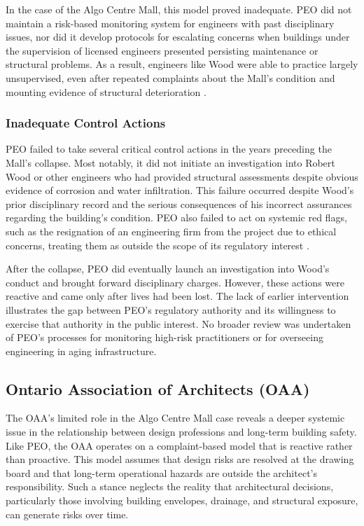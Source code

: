 \documentclass[12pt]{article}
\begin{document}
In the case of the Algo Centre Mall, this model proved inadequate. PEO did not maintain a risk-based monitoring system for engineers with past disciplinary issues, nor did it develop protocols for escalating concerns when buildings under the supervision of licensed engineers presented persisting maintenance or structural problems. As a result, engineers like Wood were able to practice largely unsupervised, even after repeated complaints about the Mall's condition and mounting evidence of structural deterioration \cite[p393-395]{AlgoLakeReport1}.

\subsubsection*{Inadequate Control Actions}

PEO failed to take several critical control actions in the years preceding the Mall's collapse. Most notably, it did not initiate an investigation into Robert Wood or other engineers who had provided structural assessments despite obvious evidence of corrosion and water infiltration. This failure occurred despite Wood's prior disciplinary record and the serious consequences of his incorrect assurances regarding the building's condition. PEO also failed to act on systemic red flags, such as the resignation of an engineering firm from the project due to ethical concerns, treating them as outside the scope of its regulatory interest \cite[p393-396]{AlgoLakeReport1}.

After the collapse, PEO did eventually launch an investigation into Wood's conduct and brought forward disciplinary charges. However, these actions were reactive and came only after lives had been lost. The lack of earlier intervention illustrates the gap between PEO's regulatory authority and its willingness to exercise that authority in the public interest. No broader review was undertaken of PEO's processes for monitoring high-risk practitioners or for overseeing engineering in aging infrastructure.

\subsection{Ontario Association of Architects (OAA)}

The OAA's limited role in the Algo Centre Mall case reveals a deeper systemic issue in the relationship between design professions and long-term building safety. Like PEO, the OAA operates on a complaint-based model that is reactive rather than proactive. This model assumes that design risks are resolved at the drawing board and that long-term operational hazards are outside the architect's responsibility. Such a stance neglects the reality that architectural decisions, particularly those involving building envelopes, drainage, and structural exposure, can generate risks over time.
\end{document}
